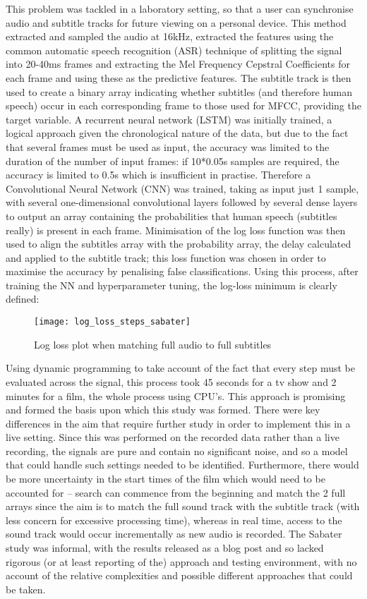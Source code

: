 This problem was tackled in a laboratory setting\cite{Sabater_2017}, so that a user can synchronise audio and subtitle tracks for future viewing on a personal device. This method extracted and sampled the audio at 16kHz, extracted the features using the common automatic speech recognition (ASR) technique of splitting the signal into 20-40ms frames and extracting the Mel Frequency Cepstral Coefficients for each frame and using these as the predictive features. The subtitle track is then used to create a binary array indicating whether subtitles (and therefore human speech) occur in each corresponding frame to those used for MFCC, providing the target variable. A recurrent neural network (LSTM) was initially trained, a logical approach given the chronological nature of the data, but due to the fact that several frames must be used as input, the accuracy was limited to the duration of the number of input frames: if 10*0.05s samples are required, the accuracy is limited to 0.5s which is insufficient in practise. Therefore a Convolutional Neural Network (CNN) was trained, taking as input just 1 sample, with several one-dimensional convolutional layers followed by several dense layers to output an array containing the probabilities that human speech (subtitles really) is present in each frame. Minimisation of the log loss function was then used to align the subtitles array with the probability array, the delay calculated and applied to the subtitle track; this loss function was chosen in order to maximise the accuracy by penalising false classifications. Using this process, after training the NN and hyperparameter tuning, the log-loss minimum is clearly defined:
\begin{wrapfigure}{r}{0.5\textwidth} 
	\texttt{[image: log\_loss\_steps\_sabater]}
	\caption{Log loss plot when matching full audio to full subtitles}
	\label{loss_sabater}
\end{wrapfigure}
Using dynamic programming to take account of the fact that every step must be evaluated across the signal, this process took 45 seconds for a tv show and 2 minutes for a film, the whole process using CPU’s. 
This approach is promising and formed the basis upon which this study was formed. There were key differences in the aim that require further study in order to implement this in a live setting.  Since this was performed on the recorded data rather than a live recording, the signals are pure and contain no significant noise, and so a model that could handle such settings needed to be identified. Furthermore, there would be more uncertainty in the start times of the film which would need to be accounted for – search can commence from the beginning and match the 2 full arrays since the aim is to match the full sound track with the subtitle track (with less concern for excessive processing time), whereas in real time, access to the sound track would occur incrementally as new audio is recorded. The Sabater study was informal, with the results released as a blog post and so lacked rigorous (or at least reporting of the) approach and testing environment, with no account of the relative complexities and possible different approaches that could be taken. \newline

